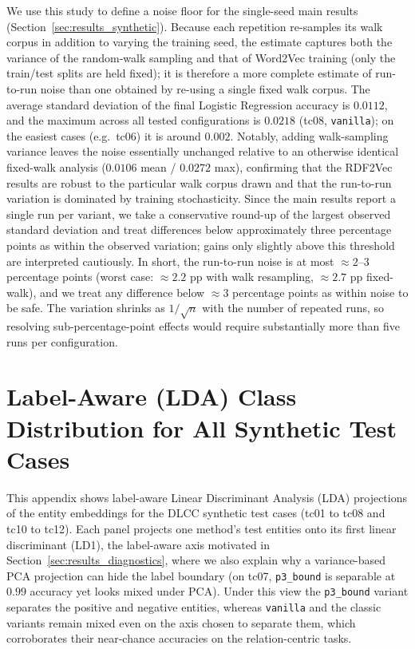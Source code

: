 \documentclass[a4paper,oneside,bibliography=totoc]{scrbook}
\begin{document}
We use this study to define a noise floor for the single-seed main results
(Section~\ref{sec:results_synthetic}). Because each repetition re-samples its
walk corpus in addition to varying the training seed, the estimate captures both
the variance of the random-walk sampling and that of Word2Vec training (only the
train/test splits are held fixed); it is therefore a more complete estimate of
run-to-run noise than one obtained by re-using a single fixed walk corpus. The
average standard deviation of the final Logistic Regression accuracy is $0.0112$,
and the maximum across all tested configurations is $0.0218$ (tc08,
\texttt{vanilla}); on the easiest cases (e.g.\ tc06) it is around $0.002$.
Notably, adding walk-sampling variance leaves the noise essentially unchanged
relative to an otherwise identical fixed-walk analysis ($0.0106$ mean / $0.0272$
max), confirming that the RDF2Vec results are robust to the particular walk
corpus drawn and that the run-to-run variation is dominated by training
stochasticity. Since the main results report a single run per variant, we take a
conservative round-up of the largest observed standard deviation and treat
differences below approximately three percentage points as within the observed
variation; gains only slightly above this threshold are interpreted cautiously.
In short, the run-to-run noise is at most ${\approx}2$--$3$ percentage points
(worst case: ${\approx}2.2$ pp with walk resampling, ${\approx}2.7$ pp fixed-walk),
and we treat any difference below ${\approx}3$ percentage points as within noise
to be safe.
The variation shrinks as $1/\sqrt{n}$ with the number of repeated runs, so
resolving sub-percentage-point effects would require substantially more than five
runs per configuration.



\section{Label-Aware (LDA) Class Distribution for All Synthetic Test Cases}
\label{app:lda-all}

This appendix shows label-aware Linear Discriminant Analysis (LDA) projections of
the entity embeddings for the DLCC synthetic test cases (tc01 to tc08 and tc10 to
tc12). Each panel projects one method's test entities onto its first linear
discriminant (LD1), the label-aware axis motivated in
Section~\ref{sec:results_diagnostics}, where we also explain why a variance-based
PCA projection can hide the label boundary (on tc07, \texttt{p3\_bound} is
separable at $0.99$ accuracy yet looks mixed under PCA). Under this view the
\texttt{p3\_bound} variant separates the positive and negative entities, whereas
\texttt{vanilla} and the classic variants remain mixed even on the axis chosen to
separate them, which corroborates their near-chance accuracies on the
relation-centric tasks.
\end{document}
